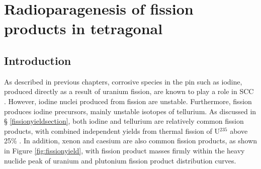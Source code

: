 \chapter{Radioparagenesis of fission products in tetragonal \zirconia}

\label{ch:results3}

\section{Introduction}


As described in previous chapters, corrosive species in the pin such as iodine, produced directly as a result of uranium fission, are known to play a role in SCC \cite{Sidky1998, Fregonese1998, iodinezrmetal}. However, iodine nuclei produced from fission are unstable. Furthermore, fission produces iodine precursors, mainly unstable isotopes of tellurium. As discussed in § \ref{fissionyieldsection}, both iodine and tellurium are relatively common fission products, with combined independent yields from thermal fission of U$^{235}$ above 25\% \cite{kennett1956mass, iodine129fissionyield, imanishi1976independent, iodine132, amiel1975odd}. In addition, xenon and caesium are also common fission products, as shown in Figure \ref{fig:fissionyield}, with fission product masses firmly within the heavy nuclide peak of uranium and plutonium fission product distribution curves.   

